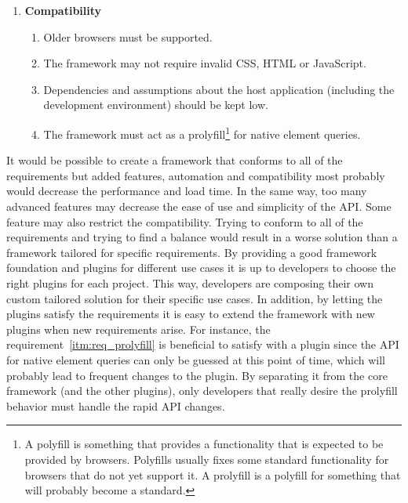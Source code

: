 \documentclass[a4paper,11pt]{kth-mag}
\begin{document}
\begin{enumerate}
          \item \textbf{Compatibility}
            \begin{enumerate}
              \item Older \glspl{browser} must be supported.
              \item The framework may not require invalid \gls{CSS}, \gls{HTML} or \gls{JavaScript}.
              \item\label{itm:assumption} Dependencies and assumptions about the host application (including the development environment) should be kept low.
              \item\label{itm:req_prolyfill} The framework must act as a prolyfill\footnote{A polyfill is something that provides a functionality that is expected to be provided  by \glspl{browser}. Polyfills usually fixes some standard functionality for \glspl{browser} that do not yet support it. A prolyfill is a polyfill for something that will probably become a standard.} for \gls{native} element queries.
            \end{enumerate}
        \end{enumerate}
        It would be possible to create a framework that conforms to all of the requirements but added features, automation and compatibility most probably would decrease the performance and load time.
        In the same way, too many advanced features may decrease the ease of use and simplicity of the \gls{API}.
        Some feature may also restrict the compatibility.
        Trying to conform to all of the requirements and trying to find a balance would result in a worse solution than a framework tailored for specific requirements.
        By providing a good framework foundation and plugins for different use cases it is up to developers to choose the right plugins for each project.
        This way, developers are composing their own custom tailored solution for their specific use cases.
        In addition, by letting the plugins satisfy the requirements it is easy to extend the framework with new plugins when new requirements arise.
        For instance, the requirement~\ref{itm:req_prolyfill} is beneficial to satisfy with a plugin since the \gls{API} for \gls{native} element queries can only be guessed at this point of time, which will probably lead to frequent changes to the plugin.
        By separating it from the core framework (and the other plugins), only developers that really desire the prolyfill behavior must handle the rapid \gls{API} changes.
\end{document}
